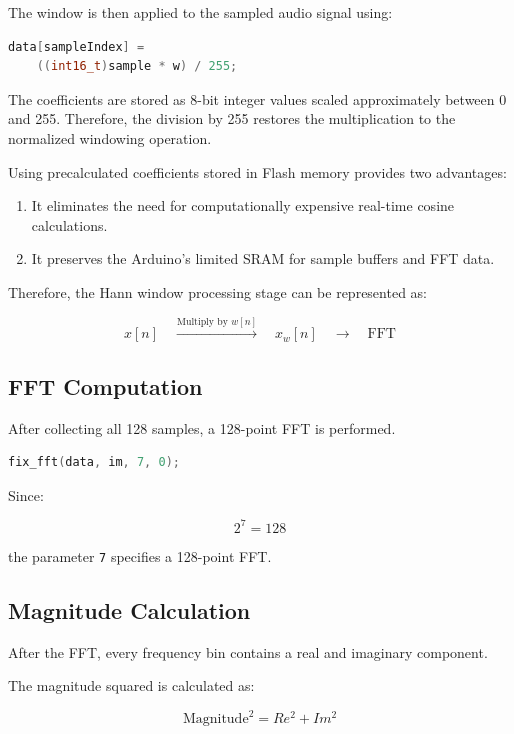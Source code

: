 \documentclass{article}
\begin{document}
\begin{center}
The window is then applied to the sampled audio signal using:

\begin{lstlisting}[language=C++]
data[sampleIndex] =
    ((int16_t)sample * w) / 255;
\end{lstlisting}

The coefficients are stored as 8-bit integer values scaled approximately between 0 and 255. Therefore, the division by 255 restores the multiplication to the normalized windowing operation.

Using precalculated coefficients stored in Flash memory provides two advantages:

\begin{enumerate}
    \item It eliminates the need for computationally expensive real-time cosine calculations.
    \item It preserves the Arduino's limited SRAM for sample buffers and FFT data.
\end{enumerate}

Therefore, the Hann window processing stage can be represented as:

\[
\boxed{x[n]}
\quad
\xrightarrow{\text{Multiply by }w[n]}
\quad
\boxed{x_w[n]}
\quad
\xrightarrow{}
\quad
\boxed{\text{FFT}}
\]

\subsection{FFT Computation}

After collecting all 128 samples, a 128-point FFT is performed.

\begin{lstlisting}[language=C++]
fix_fft(data, im, 7, 0);
\end{lstlisting}

Since:

\[
2^7 = 128
\]

the parameter \texttt{7} specifies a 128-point FFT.

\subsection{Magnitude Calculation}

After the FFT, every frequency bin contains a real and imaginary component.

The magnitude squared is calculated as:

\[
\text{Magnitude}^2 =
Re^2 + Im^2
\]


\end{center}
\end{document}

